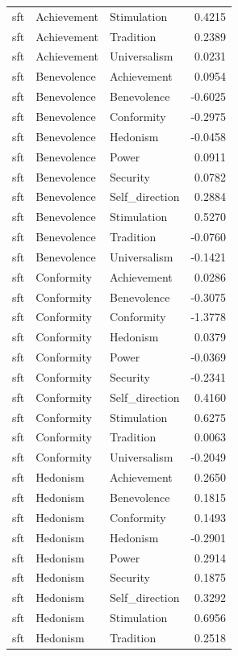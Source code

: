 \begin{tabular}{lllr}
sft & Achievement & Stimulation & 0.4215 \\
sft & Achievement & Tradition & 0.2389 \\
sft & Achievement & Universalism & 0.0231 \\
sft & Benevolence & Achievement & 0.0954 \\
sft & Benevolence & Benevolence & -0.6025 \\
sft & Benevolence & Conformity & -0.2975 \\
sft & Benevolence & Hedonism & -0.0458 \\
sft & Benevolence & Power & 0.0911 \\
sft & Benevolence & Security & 0.0782 \\
sft & Benevolence & Self\_direction & 0.2884 \\
sft & Benevolence & Stimulation & 0.5270 \\
sft & Benevolence & Tradition & -0.0760 \\
sft & Benevolence & Universalism & -0.1421 \\
sft & Conformity & Achievement & 0.0286 \\
sft & Conformity & Benevolence & -0.3075 \\
sft & Conformity & Conformity & -1.3778 \\
sft & Conformity & Hedonism & 0.0379 \\
sft & Conformity & Power & -0.0369 \\
sft & Conformity & Security & -0.2341 \\
sft & Conformity & Self\_direction & 0.4160 \\
sft & Conformity & Stimulation & 0.6275 \\
sft & Conformity & Tradition & 0.0063 \\
sft & Conformity & Universalism & -0.2049 \\
sft & Hedonism & Achievement & 0.2650 \\
sft & Hedonism & Benevolence & 0.1815 \\
sft & Hedonism & Conformity & 0.1493 \\
sft & Hedonism & Hedonism & -0.2901 \\
sft & Hedonism & Power & 0.2914 \\
sft & Hedonism & Security & 0.1875 \\
sft & Hedonism & Self\_direction & 0.3292 \\
sft & Hedonism & Stimulation & 0.6956 \\
sft & Hedonism & Tradition & 0.2518 \\

\end{tabular}

